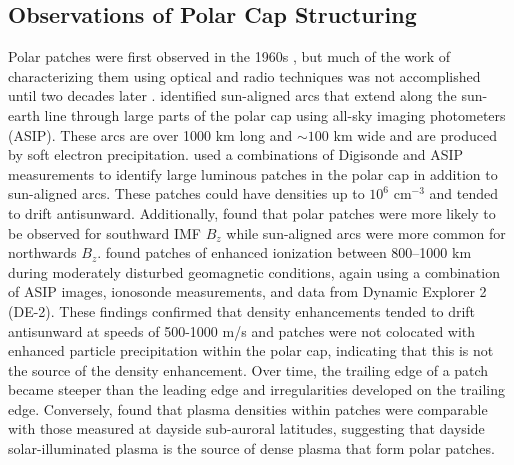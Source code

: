 


\subsection{Observations of Polar Cap Structuring}
\label{sec:lit_observations}
Polar patches were first observed in the 1960s \citep{Hill1963}, but much of the work of characterizing them using optical and radio techniques was not accomplished until two decades later \citep{Weber1981,Weber1984,Weber1986,Buchau1983,Buchau1985}.  \citet{Weber1981} identified sun-aligned arcs that extend  along the sun-earth line through large parts of the polar cap using all-sky imaging photometers (ASIP).  These arcs are over 1000 km long and \(\sim100\) km wide and are produced by soft electron precipitation.  \citet{Buchau1983} used a combinations of Digisonde and ASIP measurements to identify large luminous patches in the polar cap in addition to sun-aligned arcs.  These patches could have densities up to \(10^6\) cm\(^{-3}\) and tended to drift antisunward.  Additionally, \citet{Buchau1983} found that polar patches were more likely to be observed for southward IMF \(B_z\) while sun-aligned arcs were more common for northwards \(B_z\).  \citet{Weber1984} found patches of enhanced ionization between 800--1000 km during moderately disturbed geomagnetic conditions, again using a combination of ASIP images, ionosonde measurements, and data from Dynamic Explorer 2 (DE-2).  These findings confirmed that density enhancements tended to drift antisunward at speeds of 500-1000 m/s and patches were not colocated with enhanced particle precipitation within the polar cap, indicating that this is not the source of the density enhancement.  Over time, the trailing edge of a patch became steeper than the leading edge and irregularities developed on the trailing edge.  Conversely, \citet{Buchau1985} found that plasma densities within patches were comparable with those measured at dayside sub-auroral latitudes, suggesting that dayside solar-illuminated plasma is the source of dense plasma that form polar patches.

